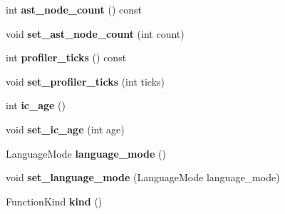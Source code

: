 \begin{DoxyCompactItemize}
\item 
int {\bfseries ast\+\_\+node\+\_\+count} () const \hypertarget{classv8_1_1internal_1_1_shared_function_info_a5542d184edffbcba61984bba7ae06f12}{}\label{classv8_1_1internal_1_1_shared_function_info_a5542d184edffbcba61984bba7ae06f12}

\item 
void {\bfseries set\+\_\+ast\+\_\+node\+\_\+count} (int count)\hypertarget{classv8_1_1internal_1_1_shared_function_info_a74bb064de27437d1bb351d66081c6f6d}{}\label{classv8_1_1internal_1_1_shared_function_info_a74bb064de27437d1bb351d66081c6f6d}

\item 
int {\bfseries profiler\+\_\+ticks} () const \hypertarget{classv8_1_1internal_1_1_shared_function_info_ac9c8c4a387ebc6224c393bb8ccedd927}{}\label{classv8_1_1internal_1_1_shared_function_info_ac9c8c4a387ebc6224c393bb8ccedd927}

\item 
void {\bfseries set\+\_\+profiler\+\_\+ticks} (int ticks)\hypertarget{classv8_1_1internal_1_1_shared_function_info_abc4260c8691ca1b95479d50217184caa}{}\label{classv8_1_1internal_1_1_shared_function_info_abc4260c8691ca1b95479d50217184caa}

\item 
int {\bfseries ic\+\_\+age} ()\hypertarget{classv8_1_1internal_1_1_shared_function_info_a030b101a70a37ebc30453317c10f4fdd}{}\label{classv8_1_1internal_1_1_shared_function_info_a030b101a70a37ebc30453317c10f4fdd}

\item 
void {\bfseries set\+\_\+ic\+\_\+age} (int age)\hypertarget{classv8_1_1internal_1_1_shared_function_info_a72b9bc377ff697568fb6eb231adba12b}{}\label{classv8_1_1internal_1_1_shared_function_info_a72b9bc377ff697568fb6eb231adba12b}

\item 
Language\+Mode {\bfseries language\+\_\+mode} ()\hypertarget{classv8_1_1internal_1_1_shared_function_info_a85571f6c4a39323926fc1266c57d4522}{}\label{classv8_1_1internal_1_1_shared_function_info_a85571f6c4a39323926fc1266c57d4522}

\item 
void {\bfseries set\+\_\+language\+\_\+mode} (Language\+Mode language\+\_\+mode)\hypertarget{classv8_1_1internal_1_1_shared_function_info_ae43209f7f1d45525f7c9960a47d21955}{}\label{classv8_1_1internal_1_1_shared_function_info_ae43209f7f1d45525f7c9960a47d21955}

\item 
Function\+Kind {\bfseries kind} ()\hypertarget{classv8_1_1internal_1_1_shared_function_info_ad9c02cf29d45dbce22bf59b47f3d9276}{}\label{classv8_1_1internal_1_1_shared_function_info_ad9c02cf29d45dbce22bf59b47f3d9276}


\end{DoxyCompactItemize}
